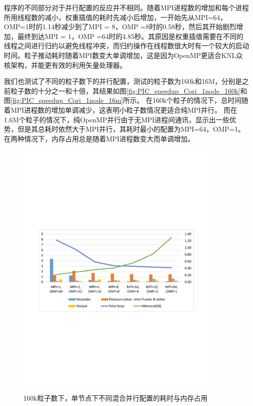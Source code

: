 程序的不同部分对于并行配置的反应并不相同。随着MPI进程数的增加和每个进程所用线程数的减小，权重插值的耗时先减小后增加，一开始先从MPI=64，OMP=1时的1.14秒减少到了MPI = 8，OMP =8时的0.58秒，然后其开始剧烈增加，最终到达MPI = 1，OMP =64时的4.85秒。其原因是权重插值需要在不同的线程之间进行归约以避免线程冲突，而归约操作在线程数很大时有一个较大的启动时间。粒子推动耗时随着MPI数变大单调增加，这是因为OpenMP更适合KNL众核架构，并能更有效的利用矢量处理器。

我们也测试了不同的粒子数下的并行配置，测试的粒子数为160k和16M，分别是之前粒子数的十分之一和十倍，其结果如图\eqref{fig:PIC_speedup_Cori_1node_160k}和图\eqref{fig:PIC_speedup_Cori_1node_16m}所示。
在160k个粒子的情况下，总时间随着MPI进程数的增加单调减少，这表明小粒子数情况更适合纯MPI并行。
而在1.6M个粒子的情况下，纯OpenMP并行由于无MPI进程间通讯，显示出一些优势，但是其总耗时依然大于MPI并行，其耗时最小的配置为MPI=64，OMP=1。
在两种情况下，内存占用总是随着MPI进程数变大而单调增加。

\begin{figure}[!htb]
  \centering
  \includegraphics[width=0.9\textwidth]{Img/PIC_speedup_Cori_1node_160k.pdf}
  \caption{160k粒子数下，单节点下不同混合并行配置的耗时与内存占用}
  \label{fig:PIC_speedup_Cori_1node_160k}
\end{figure}

